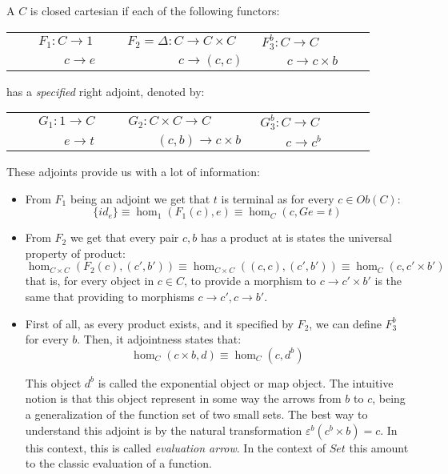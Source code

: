   \begin{definition}
    A $C$ is closed cartesian if each of the following functors:
\begin{center}
  \begin{tabular}{p{0.3\linewidth}p{0.3\linewidth}p{0.3\linewidth}}
    $\qquad F_1:C\to 1$&$ F_2=\Delta: C \to C\times C $&$ F_{3}^b:C \to C$\\
    $\qquad \qquad c\to e$&$ \qquad \qquad c \to  (c,c)$&$ \qquad c \to c\times b$\\
  \end{tabular}
\end{center}
has a \emph{specified} right adjoint, denoted by:
\begin{center}
  \begin{tabular}{p{0.3\linewidth}p{0.3\linewidth}p{0.3\linewidth}}
    $\qquad G_1:1\to C$&$ G_2:  C\times C\to C $&$ G_{3}^b:C \to C$\\
    $\qquad \qquad e\to t$&$ \  \qquad (c,b)\to c \times b$&$ \qquad c \to c^b$\\
  \end{tabular}
\end{center}

These adjoints provide us with a lot of information:
\begin{itemize}
\item From $F_1$ being an adjoint we get that $t$ is terminal as for every $c\in Ob(C)$:
  $$\{id_e\} \equiv \hom_1(F_1(c), e) \equiv \hom_C(c,Ge=t)   $$
\item From $F_2$ we get that every pair $c,b$ has a product at is states the universal property of product:
  $$\hom_{C\times C}(F_2(c), (c',b'))\equiv \hom_{C\times C}((c,c), (c',b')) \equiv \hom_C(c,c'\times b')$$
  that is, for every object in $c\in C$, to provide a morphism to $c\to c'\times b'$ is the same that providing to morphisms $c\to c',c\to b'$.
\item First of all, as every product exists, and it specified by $F_2$, we can define $F_3^b$ for every $b$. Then, it adjointness states that:
  $$\hom_C(c\times b, d) \equiv \hom_C(c,d^b)   $$

  This object $d^b$ is called the exponential object or map object. The intuitive notion is that this object represent in some way the arrows from $b$ to $c$, being a generalization of the function set of two small sets. The best way to understand this adjoint is by the natural transformation $\varepsilon^b(c^b\times b) = c$. In this context, this is called \emph{evaluation arrow}. In the context of $Set$ this amount to the classic evaluation of a function.\\


\end{itemize}
\end{definition}
